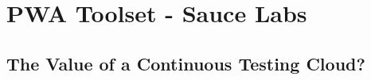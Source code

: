 \maketitle{}
\section{ PWA Toolset - Sauce Labs }

\subsection{ The Value of a Continuous Testing Cloud? }
